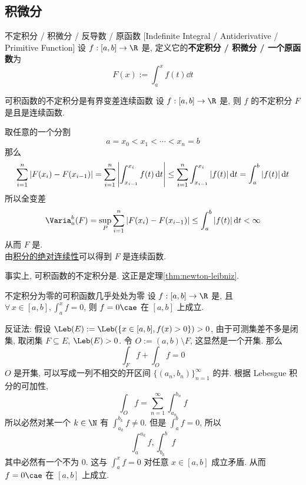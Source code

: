 \subsection{积微分}
\begin{dfn}
    {不定积分 / 积微分 / 反导数 / 原函数}
    [Indefinite Integral / Antiderivative / Primitive Function]
    设 \(f:[a,b]\to\R\) 是\IntegrableFunc{}, 定义它的\textbf{不定积分 / 积微分 / 一个原函数}为
    \[F(x):=\int_a^x f(t) \dd{t}\]
\end{dfn}
\begin{thm}
    {可积函数的不定积分是有界变差连续函数}
    设 \(f:[a,b]\to\R\) 是\IntegrableFunc{}, 则 \(f\) 的不定积分 \(F\) 是\BVFunc{}且是连续函数.
\end{thm}
\begin{prf}
    取任意的一个分割
    \[a=x_0<x_1<\cdots<x_n=b \]
    那么
    \[\sum_{i=1}^n |F(x_i)-F(x_{i-1})|=\sum_{i=1}^n\abs{\int_{x_{i-1}}^{x_i}f(t)\dd{t}}\leq\sum_{i=1}^n\int_{x_{i-1}}^{x_i}\abs{f(t)}\dd{t}=\int_a^b |f(t)|\dd{t}  \]
    所以全变差
    \[\Varia_a^b(F) = \sup_P \sum_{i=1}^n |F(x_i)-F(x_{i-1})| \leq \int_a^b |f(t)|\dd{t} < \infty\]
    从而 \(F\) 是\BVFunc{}.\\
    由\hyperref[thm:integral-absolute-continuity]{积分的绝对连续性}可以得到 \(F\) 是连续函数.
\end{prf}
\begin{rmk}
    事实上, 可积函数的不定积分是\ACFunc{}. 这正是定理\ref{thm:newton-leibniz}.
\end{rmk}
\begin{thm}
    {不定积分为零的可积函数几乎处处为零}
    设 \(f:[a,b]\to\R\) 是\IntegrableFunc{}, 且 \(\forall\,x\in[a,b], \int_a^x f = 0\), 则 \(f=0\cae\) 在 \([a,b]\) 上成立.
\end{thm}
\begin{prf}
    反证法: 假设 \(\Leb(E):=\Leb(\{x\in[a,b], f(x)>0\})>0\), 由于可测集差不多是闭集, 取闭集 \(F\subseteq E\), \(\Leb(E)>0\). 令 \(O:=(a,b)\setminus F\), 这显然是一个开集. 那么
    \[\int_F f+\int_O f=0\]
    \(O\) 是开集, 可以写成一列不相交的开区间 \(\{(a_n,b_n)\}_{n=1}^\infty\) 的并. 根据 Lebesgue 积分的可加性,
    \[\int_O f=\sum_{n=1}^\infty \int_{a_n}^{b_n} f\]
    所以必然对某一个 \(k\in\N\) 有 \(\int_{a_k}^{b_k}f\neq 0\). 但是 \(\int_a^b f =0\), 所以
    \[\int_a^{a_k} f, \int^{b}_{b_k} f \]
    其中必然有一个不为 0. 这与 \(\int_a^x f = 0\) 对任意 \(x\in[a,b]\) 成立矛盾. 从而 \(f=0\cae\) 在 \([a,b]\) 上成立. 
\end{prf}
